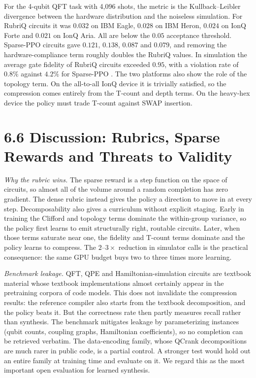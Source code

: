 \documentclass{report}
\theoremstyle{plain}
\theoremstyle{definition}
\theoremstyle{remark}
\begin{document}
For the 4-qubit QFT task with 4,096 shots, the metric is the Kullback--Leibler divergence between the hardware distribution and the noiseless simulation. For RubriQ circuits it was $0.032$ on IBM Eagle, $0.028$ on IBM Heron, $0.024$ on IonQ Forte and $0.021$ on IonQ Aria. All are below the $0.05$ acceptance threshold. Sparse-PPO circuits gave $0.121$, $0.138$, $0.087$ and $0.079$, and removing the hardware-compliance term roughly doubles the RubriQ values. In simulation the average gate fidelity of RubriQ circuits exceeded $0.95$, with a violation rate of $0.8\%$ against $4.2\%$ for Sparse-PPO \cite{guo2026rubriq}. The two platforms also show the role of the topology term. On the all-to-all IonQ device it is trivially satisfied, so the compression comes entirely from the T-count and depth terms. On the heavy-hex device the policy must trade T-count against SWAP insertion.

\section{6.6 Discussion: Rubrics, Sparse Rewards and Threats to Validity}\label{sec:syn:rubriq-discussion}

\emph{Why the rubric wins.} The sparse reward is a step function on the space of circuits, so almost all of the volume around a random completion has zero gradient. The dense rubric instead gives the policy a direction to move in at every step. Decomposability also gives a curriculum without explicit staging. Early in training the Clifford and topology terms dominate the within-group variance, so the policy first learns to emit structurally right, routable circuits. Later, when those terms saturate near one, the fidelity and T-count terms dominate and the policy learns to compress. The $2$--$3\times$ reduction in simulator calls is the practical consequence: the same GPU budget buys two to three times more learning.

\emph{Benchmark leakage.} QFT, QPE and Hamiltonian-simulation circuits are textbook material whose textbook implementations almost certainly appear in the pretraining corpora of code models. This does not invalidate the compression results: the reference compiler also starts from the textbook decomposition, and the policy beats it. But the correctness rate then partly measures recall rather than synthesis. The benchmark mitigates leakage by parameterizing instances (qubit counts, coupling graphs, Hamiltonian coefficients), so no completion can be retrieved verbatim. The data-encoding family, whose QCrank decompositions are much rarer in public code, is a partial control. A stronger test would hold out an entire family at training time and evaluate on it. We regard this as the most important open evaluation for learned synthesis.
\end{document}
